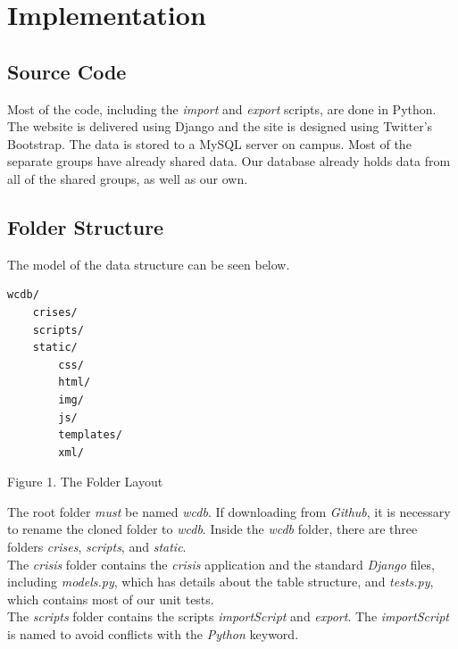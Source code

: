 \documentclass[12pt]{report}
\begin{document}
\newpage
\section*{Implementation}
\hfill


\subsection*{Source Code}
\hfill


Most of the code, including the \emph{import} and \emph{export} scripts, are done in Python.
The website is delivered using Django and the site is designed using Twitter's Bootstrap.
The data is stored to a MySQL server on campus.
Most of the separate groups have already shared data.
Our database already holds data from all of the shared groups, as well as our own.\\

\subsection*{Folder Structure}
\hfill


The model of the data structure can be seen below.\\

\begin{lstlisting}
wcdb/
    crises/
    scripts/
    static/
        css/
        html/
        img/
        js/
        templates/
        xml/
\end{lstlisting}
\footnotesize Figure 1. The Folder Layout \normalsize
\hfill


The root folder \emph{must} be named \emph{wcdb}.
If downloading from \emph{Github}, it is necessary to rename the cloned folder to \emph{wcdb}.
Inside the \emph{wcdb} folder, there are three folders \emph{crises}, \emph{scripts}, and \emph{static}.\\


The \emph{crisis} folder contains the \emph{crisis} application and the standard \emph{Django} files,
including \emph{models.py}, which has details about the table structure, and \emph{tests.py}, which contains
most of our unit tests.\\


The \emph{scripts} folder contains the scripts \emph{importScript} and \emph{export}.
The \emph{importScript} is named to avoid conflicts with the \emph{Python} keyword.\\
\end{document}
